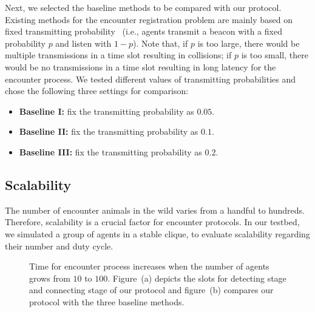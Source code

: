 Next, we selected the baseline methods to be compared with our protocol. 
Existing methods for the encounter registration problem are mainly based on fixed transmitting 
probability~\cite{Menhill2012NovelTelemetry,Rutz2012AutomatedMapping}
(i.e., agents transmit a beacon with a fixed probability $p$ and listen with $1-p$).  
Note that, if $p$ is too large, there would be multiple transmissions in a time slot resulting in 
collisions; if $p$ is too small, there would be no transmissions in a time slot resulting 
in long latency for the encounter process.
We tested different values of transmitting probabilities and chose the 
following three settings for comparison: 
\begin{itemize}
    \item \textbf{Baseline I:} fix the transmitting probability as $0.05$. 
    \item \textbf{Baseline II:} fix the transmitting probability as $0.1$. 
    \item \textbf{Baseline III:} fix the transmitting probability as $0.2$. 
\end{itemize}


\subsection{Scalability}

The number of encounter animals in the wild varies from a handful to hundreds. 
Therefore, scalability is a crucial factor for encounter protocols. 
In our testbed, we simulated a group of agents in a stable clique, to evaluate scalability 
regarding their number and duty cycle.

\begin{figure}[h]
    \centering
    \hspace{0.01in}
    \caption{Time for encounter process increases when the number of agents grows from $10$ to $100$.
    Figure~(a) depicts the slots for detecting stage and connecting stage of our protocol and figure~(b)
    compares our protocol with the three baseline methods.}
    \label{fig_num}
\end{figure}

